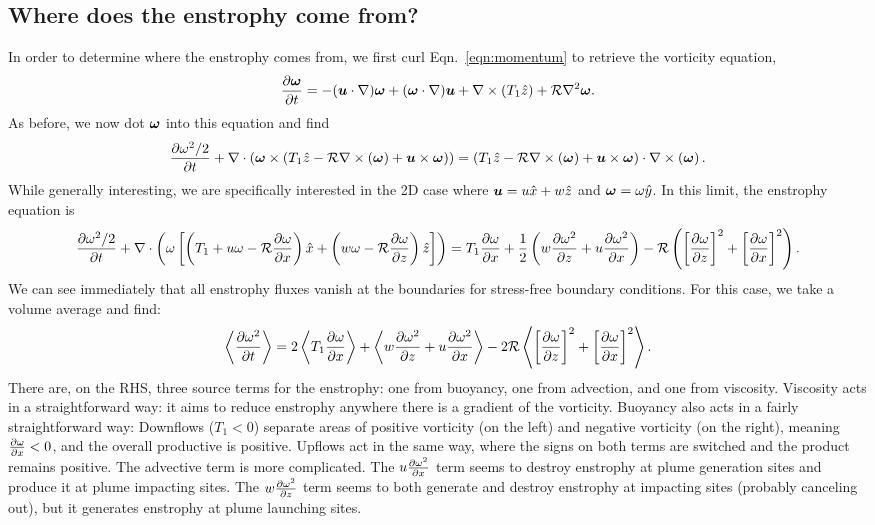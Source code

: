 \subsection{Where does the enstrophy come from?}
\label{sec:enstrophy_generation}
In order to determine where the enstrophy comes from, we first curl Eqn.~\ref{eqn:momentum} to retrieve the vorticity equation,
\begin{equation}
\frac{\partial \bm{\omega}}{\partial t} = -(\bm{u} \cdot \nabla)\bm{\omega} + (\bm{\omega} \cdot \nabla)\bm{u} + \nabla \times \left(T_1\hat{z}\right) + \mathcal{R} \nabla^2 \bm{\omega}.
\end{equation}
As before, we now dot $\bm{\omega}$ into this equation and find
\begin{equation}
\frac{\partial \omega^2/2}{\partial t} + \nabla\cdot\left( \bm{\omega} \times \left(T_1\hat{z} - \mathcal{R}\nabla \times \left(\bm{\omega}\right) + \bm{u} \times \bm{\omega}\right)\right) = \left(T_1\hat{z} - \mathcal{R}\nabla \times \left(\bm{\omega}\right) + \bm{u} \times \bm{\omega}\right) \cdot \nabla \times \left(\bm{\omega}\right).
\end{equation}
While generally interesting, we are specifically interested in the 2D case where $\bm{u} = u\hat{x} + w\hat{z}$ and $\bm{\omega} = \omega\hat{y}$.
In this limit, the enstrophy equation is
\begin{equation}
\frac{\partial \omega^2/2}{\partial t} + \nabla\cdot\left( \omega\left[\left(T_1 + u\omega - \mathcal{R}\frac{\partial \omega}{\partial x}\right)\hat{x} + \left(w\omega - \mathcal{R}\frac{\partial \omega}{\partial z}\right)\hat{z}\right]\right) 
= T_1\frac{\partial \omega}{\partial x} + \frac{1}{2}\left(w\frac{\partial \omega^2}{\partial z} + u\frac{\partial \omega^2}{\partial x}\right) - \mathcal{R} \left(\left[\frac{\partial \omega}{\partial z}\right]^2 + \left[\frac{\partial \omega}{\partial x}\right]^2\right).
\end{equation}
We can see immediately that all enstrophy fluxes vanish at the boundaries for stress-free boundary conditions.
For this case, we take a volume average and find:
\begin{equation}
\left\langle \frac{\partial \omega^2}{\partial t} \right\rangle = 2\left\langle T_1\frac{\partial \omega}{\partial x} \right\rangle + \left\langle w\frac{\partial \omega^2}{\partial z} + u\frac{\partial \omega^2}{\partial x} \right\rangle - 2\mathcal{R} \left\langle \left[\frac{\partial \omega}{\partial z}\right]^2 + \left[\frac{\partial \omega}{\partial x}\right]^2 \right\rangle.
\end{equation}
There are, on the RHS, three source terms for the enstrophy: one from buoyancy, one from advection, and one from viscosity.
Viscosity acts in a straightforward way: it aims to reduce enstrophy anywhere there is a gradient of the vorticity.
Buoyancy also acts in a fairly straightforward way: Downflows ($T_1 < 0$) separate areas of positive vorticity (on the left) and negative vorticity (on the right), meaning $\frac{\partial \omega}{\partial x} < 0$, and the overall productive is positive.
Upflows act in the same way, where the signs on both terms are switched and the product remains positive.
The advective term is more complicated.
The $u \frac{\partial \omega^2}{\partial x}$ term seems to destroy enstrophy at plume generation sites and produce it at plume impacting sites.
The $w \frac{\partial \omega^2}{\partial z}$ term seems to both generate and destroy enstrophy at  impacting sites (probably canceling out), but it generates enstrophy at plume launching sites.

